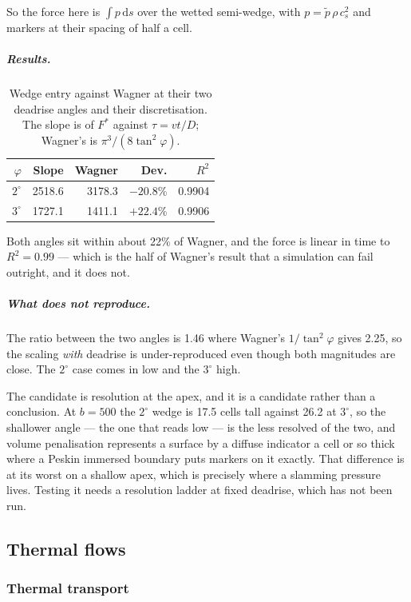 \documentclass[11pt,a4paper]{article}
\begin{document}
So the force here is $\int p\,\mathrm{d}s$ over the wetted semi-wedge, with
$p = \tilde p\,\rho\,c_s^2$ and markers at their spacing of half a cell.

\subparagraph{Results.}

\begin{table}[htbp]
  \centering
  \caption{Wedge entry against Wagner at their two deadrise angles and their
  discretisation. The slope is of $F^*$ against $\tau=vt/D$; Wagner's is
  $\pi^3/(8\tan^2\varphi)$.}
  \label{tab:enanwedge}
  \begin{tabular}{rrrrr}
    \toprule
    $\varphi$ & Slope & Wagner & Dev. & $R^2$ \\
    \midrule
    $2^\circ$ & 2518.6 & 3178.3 & $-20.8$\% & 0.9904 \\
    $3^\circ$ & 1727.1 & 1411.1 & $+22.4$\% & 0.9906 \\
    \bottomrule
  \end{tabular}
\end{table}

Both angles sit within about 22\% of Wagner, and the force is linear in time to
$R^2=0.99$ --- which is the half of Wagner's result that a simulation can fail
outright, and it does not.

\subparagraph{What does not reproduce.} The ratio between the two angles is
1.46 where Wagner's $1/\tan^2\varphi$ gives 2.25, so the scaling \emph{with}
deadrise is under-reproduced even though both magnitudes are close. The
$2^\circ$ case comes in low and the $3^\circ$ high.

The candidate is resolution at the apex, and it is a candidate rather than a
conclusion. At $b=500$ the $2^\circ$ wedge is 17.5 cells tall against 26.2 at
$3^\circ$, so the shallower angle --- the one that reads low --- is the less
resolved of the two, and volume penalisation represents a surface by a diffuse
indicator a cell or so thick where a Peskin immersed boundary puts markers on
it exactly. That difference is at its worst on a shallow apex, which is
precisely where a slamming pressure lives. Testing it needs a resolution ladder
at fixed deadrise, which has not been run.

\subsection{Thermal flows}
\label{sec:val:thermal}
\subsubsection{Thermal transport}
\end{document}
